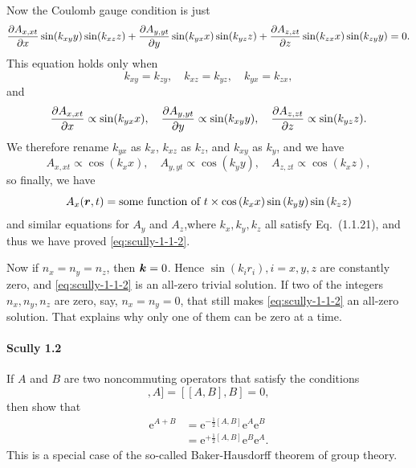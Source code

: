 \documentclass[hyperref, a4paper]{article}
\newcommand*{\ee}{\mathrm{e}}
\begin{document}
Now the Coulomb gauge condition is just
\[
    \pdv{A_{x, xt}}{x} \sin(k_{xy} y) \sin(k_{xz} z) + \pdv{A_{y, yt}}{y} \sin(k_{yx} x) \sin(k_{yz} z) + \pdv{A_{z, zt}}{z} \sin(k_{zx} x) \sin(k_{zy} y) = 0.
\]
This equation holds only when
\[
    k_{xy} = k_{zy}, \quad k_{xz} = k_{yz}, \quad k_{yx} = k_{zx},
\]
and
\[
    \pdv{A_{x, xt}}{x} \propto \sin(k_{yx} x), \quad \pdv{A_{y, yt}}{y} \propto \sin(k_{xy} y) , \quad \pdv{A_{z, zt}}{z} \propto \sin(k_{yz} z).
\]
We therefore rename $k_{yx}$ as $k_x$, $k_{xz}$ as $k_z$, and $k_{xy}$ as $k_y$, and we have
\[
    A_{x, xt} \propto \cos(k_x x), \quad A_{y, yt} \propto \cos(k_y y), \quad A_{z, zt} \propto \cos(k_x z),
\]
so finally, we have 
\[
    A_x(\vb*{r}, t) = \text{some function of $t$} \times \cos \left(k_{x} x\right) \sin \left(k_{y} y\right) \sin \left(k_{z} z\right)
\]
and similar equations for $A_y$ and $A_z$,where $k_x, k_y, k_z$ all satisfy Eq.~(1.1.21), and thus we have proved \eqref{eq:scully-1-1-2}.

Now if $n_x = n_y = n_z$, then $\vb*{k} = 0$. Hence $\sin(k_i r_i), i = x, y, z$ are constantly zero, and \eqref{eq:scully-1-1-2} is an all-zero trivial solution.
If two of the integers $n_x, n_y, n_z$ are zero, say, $n_x = n_y = 0$, that still makes \eqref{eq:scully-1-1-2} an all-zero solution.
That explains why only one of them can be zero at a time.

\paragraph{Scully 1.2} If $A$ and $B$ are two noncommuting operators that satisfy the conditions
\begin{equation}
    [[A, B], A]=[[A, B], B]=0,
    \label{eq:scully-1-2-1}
\end{equation}
then show that
\begin{equation}
    \begin{aligned}
        \ee^{A+B} &= \ee^{-\frac{1}{2}[A, B]} \ee^{A} \ee^{B} \\
        &= \ee^{+\frac{1}{2}[A, B]} \ee^{B} \ee^{A}.
    \end{aligned}
    \label{eq:scully-1-2-2}    
\end{equation}
This is a special case of the so-called Baker-Hausdorff theorem of group theory.
\end{document}
